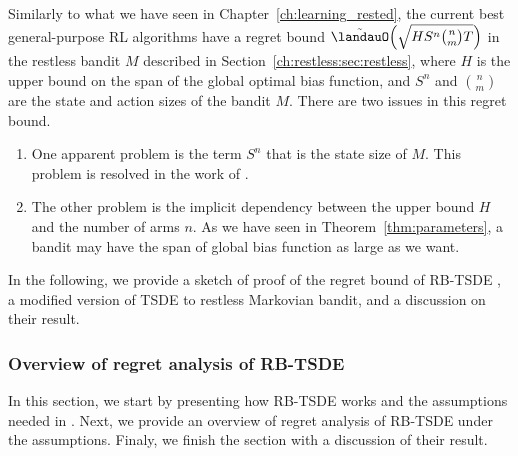 Similarly to what we have seen in Chapter~\ref{ch:learning_rested}, the current best general-purpose RL algorithms have a regret bound $\tilde{\landauO}\Bigl(\sqrt{HS^n{n \choose m}T}\Bigr)$ in the restless bandit $M$ described in Section~\ref{ch:restless:sec:restless}, where $H$ is the upper bound on the span of the global optimal bias function, and $S^n$ and ${n \choose m}$ are the state and action sizes of the bandit $M$.
There are two issues in this regret bound.
\begin{enumerate}[label=(\alph*)]
    \item \label{it:state_exponential} One apparent problem is the term $S^n$ that is the state size of $M$. This problem is resolved in the work of \cite{ortner2012regret, jung2019thompson, akbarzadeh2022learning}.
    \item \label{it:diameter_exponential} The other problem is the implicit dependency between the upper bound $H$ and the number of arms $n$. As we have seen in Theorem~\ref{thm:parameters}, a bandit may have the span of global bias function as large as we want.
\end{enumerate}


In the following, we provide a sketch of proof of the regret bound of RB-TSDE \cite{akbarzadeh2022learning}, a modified version of TSDE \cite{ouyang2017learning} to restless Markovian bandit, and a discussion on their result.


\subsubsection{Overview of regret analysis of RB-TSDE {\cite{akbarzadeh2022learning}}}

In this section, we start by presenting how RB-TSDE \cite{akbarzadeh2022learning} works and the assumptions needed in \cite{akbarzadeh2022learning}. Next, we provide an overview of regret analysis of RB-TSDE under the assumptions. Finaly, we finish the section with a discussion of their result.


